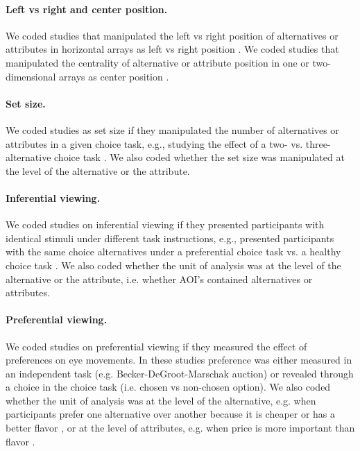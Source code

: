 \documentclass{article}
\begin{document}
\paragraph{Left vs right and center position.} We coded studies that manipulated the left vs right position of alternatives or attributes in horizontal arrays as left vs right position \citep{kreplin2014a}. We coded studies that manipulated the centrality of alternative or attribute position in one or two-dimensional arrays as center position \citep[experiment 1A \& 1B in][]{atalay2012a,meissner2016a}.

\paragraph{Set size.} We coded studies as set size if they manipulated the number of alternatives or attributes in a given choice task, e.g., studying the effect of a two- vs. three-alternative choice task \citep{hong2016a}. We also coded whether the set size was manipulated at the level of the alternative or the attribute. 

\paragraph{Inferential viewing.} We coded studies on inferential viewing if they presented participants with identical stimuli under different task instructions, e.g., presented participants with the same choice alternatives under a preferential choice task vs. a healthy choice task \citep{orquin2019a}. We also coded whether the unit of analysis was at the level of the alternative or the attribute, i.e. whether AOI's contained alternatives or attributes. 

\paragraph{Preferential viewing.} We coded studies on preferential viewing if they measured the effect of preferences on eye movements. In these studies preference was either measured in an independent task (e.g. Becker-DeGroot-Marschak auction) or revealed through a choice in the choice task (i.e. chosen vs non-chosen option). We also coded whether the unit of analysis was at the level of the alternative, e.g. when participants prefer one alternative over another because it is cheaper or has a better flavor \citep{gidloef2017a}, or at the level of attributes, e.g. when price is more important than flavor \citep{meissner2016a}. 
\end{document}
